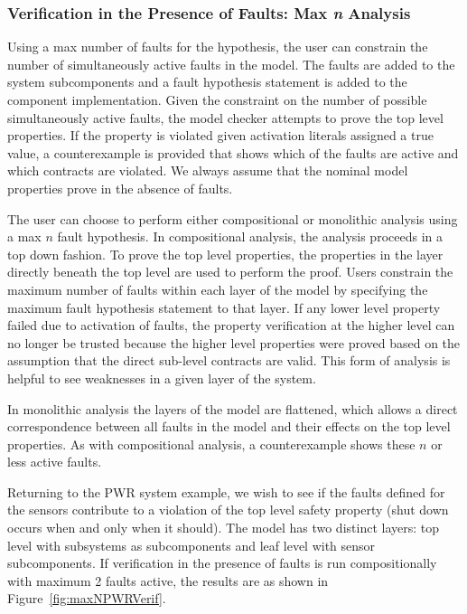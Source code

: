 \subsubsection{Verification in the Presence of Faults: Max \textit{n} Analysis}
Using a max number of faults for the hypothesis, the user can constrain the number of simultaneously active faults in the model. The faults are added to the system subcomponents and a fault hypothesis statement is added to the component implementation. Given the constraint on the number of possible simultaneously active faults, the model checker attempts to prove the top level properties. If the property is violated given activation literals assigned a true value, a counterexample is provided that shows which of the faults are active and which contracts are violated. We always assume that the nominal model properties prove in the absence of faults.

The user can choose to perform either compositional or monolithic analysis using a max $n$ fault hypothesis. In compositional analysis, the analysis proceeds in a top down fashion. To prove the top level properties, the properties in the layer directly beneath the top level are used to perform the proof. Users constrain the maximum number of faults within each layer of the model by specifying the maximum fault hypothesis statement to that layer. If any lower level property failed due to activation of faults, the property verification at the higher level can no longer be trusted because the higher level properties were proved based on the assumption that the direct sub-level contracts are valid. This form of analysis is helpful to see weaknesses in a given layer of the system. 

In monolithic analysis the layers of the model are flattened, which allows a direct correspondence between all faults in the model and their effects on the top level properties. As with compositional analysis, a counterexample shows these $n$ or less active faults. 

Returning to the PWR system example, we wish to see if the faults defined for the sensors contribute to a violation of the top level safety property (shut down occurs when and only when it should). The model has two distinct layers: top level with subsystems as subcomponents and leaf level with sensor subcomponents. If verification in the presence of faults is run compositionally with maximum 2 faults active, the results are as shown in Figure~\ref{fig:maxNPWRVerif}. 

